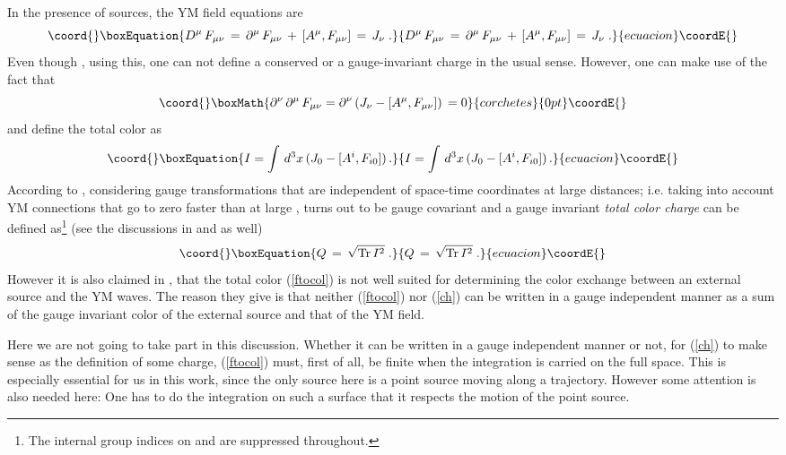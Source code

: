 \documentclass[a4paper,twocolumn,prd,showpacs,amsmath,amssymb]{revtex4}
\begin{document}
In the presence of sources, the YM field equations are
\begin{equation}\coord{}\boxEquation{
D^{\mu} \, F_{\mu\nu} \, = \, \partial^{\mu} \, F_{\mu\nu} \, +
\, [A^{\mu},F_{\mu\nu}] \, = \, J_{\nu} \; .
\label{symeq}
}{
D^{\mu} \, F_{\mu\nu} \, = \, \partial^{\mu} \, F_{\mu\nu} \, +
\, [A^{\mu},F_{\mu\nu}] \, = \, J_{\nu} \; .
}{ecuacion}\coordE{}\end{equation}
Even though \coordHE{}, using this, one can not define a conserved or
a gauge-invariant charge in the usual sense. However, one can make use of the
fact that
\[\coord{}\boxMath{ \partial^{\nu} \, \partial^{\mu} \, F_{\mu\nu} = \partial^{\nu} \,
(J_{\nu} - [A^{\mu},F_{\mu\nu}] ) \, = 0 }{corchetes}{0pt}\coordE{}\]
and define the total color as
\begin{equation}\coord{}\boxEquation{
I = \int \, d^3x \, (J_{0} - [A^{i},F_{i0}]) \, .
\label{ftocol}
}{
I = \int \, d^3x \, (J_{0} - [A^{i},F_{i0}]) \, .
}{ecuacion}\coordE{}\end{equation}
According to \cite{olt}, considering gauge transformations that are independent
of space-time coordinates at large distances; i.e. taking into account YM
connections \coordHE{} that go to zero faster than \coordHE{} at large \coordHE{}, \coordHE{} turns
out to be gauge covariant and a gauge invariant {\it total color charge} can be defined
as\footnote{The internal group indices on \coordHE{} and \coordHE{} are suppressed throughout.}
(see the discussions in \cite{tt} and \cite{olt} as well)
\begin{equation}\coord{}\boxEquation{
Q \, = \, \sqrt{\mbox{Tr} \, I^2} \; .
\label{ch}
}{
Q \, = \, \sqrt{\mbox{Tr} \, I^2} \; .
}{ecuacion}\coordE{}\end{equation}
However it is also claimed in \cite{lo}, \cite{olt} that the total color
(\ref{ftocol}) is not well suited for determining the color exchange between
an external source and the YM waves. The reason they give is that neither
(\ref{ftocol}) nor (\ref{ch}) can be written in a gauge independent manner
as a sum of the gauge invariant color of the external source and that of the
YM field.

Here we are not going to take part in this discussion. Whether it can
be written in a gauge independent manner or not, for (\ref{ch}) to make sense
as the definition of some charge, (\ref{ftocol}) must, first of all, be finite
when the integration is carried on the full space. This is especially essential
for us in this work, since the only source here is a point source moving along a
trajectory. However some attention is also needed here: One has to do the
integration on such a surface that it respects the motion of the point source.
\end{document}
